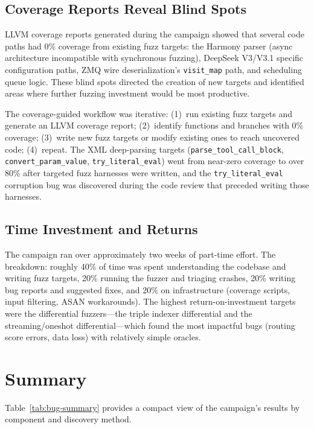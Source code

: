 \subsection{Coverage Reports Reveal Blind Spots}

LLVM coverage reports generated during the campaign showed that several code paths had 0\% coverage from existing fuzz targets: the Harmony parser (async architecture incompatible with synchronous fuzzing), DeepSeek V3/V3.1 specific configuration paths, ZMQ wire deserialization's \texttt{visit\_map} path, and scheduling queue logic. These blind spots directed the creation of new targets and identified areas where further fuzzing investment would be most productive.

The coverage-guided workflow was iterative: (1)~run existing fuzz targets and generate an LLVM coverage report; (2)~identify functions and branches with 0\% coverage; (3)~write new fuzz targets or modify existing ones to reach uncovered code; (4)~repeat. The XML deep-parsing targets (\texttt{parse\_tool\_call\_block}, \texttt{convert\_param\_value}, \texttt{try\_literal\_eval}) went from near-zero coverage to over 80\% after targeted fuzz harnesses were written, and the \texttt{try\_literal\_eval} corruption bug was discovered during the code review that preceded writing those harnesses.

\subsection{Time Investment and Returns}

The campaign ran over approximately two weeks of part-time effort. The breakdown: roughly 40\% of time was spent understanding the codebase and writing fuzz targets, 20\% running the fuzzer and triaging crashes, 20\% writing bug reports and suggested fixes, and 20\% on infrastructure (coverage scripts, input filtering, ASAN workarounds). The highest return-on-investment targets were the differential fuzzers---the triple indexer differential and the streaming/oneshot differential---which found the most impactful bugs (routing score errors, data loss) with relatively simple oracles.

\section{Summary}

Table~\ref{tab:bug-summary} provides a compact view of the campaign's results by component and discovery method.

